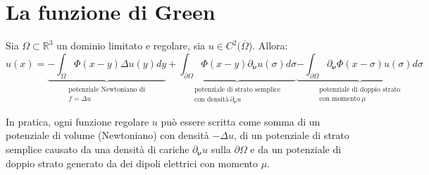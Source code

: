 \documentclass[10pt,a4paper,twoside,openright]{book}
\begin{document}
\section{La funzione di Green}
\begin{theorem}
	Sia $\displaystyle \Omega \subset \mathbb{R}^{3}$ un dominio limitato e regolare, sia $\displaystyle u\in C^{2}(\overline{\Omega }$). Allora:
	\begin{equation*}
		u(x) =\underbrace{-\int _{\Omega } \Phi (x-y) \Delta u(y) dy}_{ \begin{array}{l}
			\text{potenziale Newtoniano di}\\
			f=\Delta u
			\end{array}} +\underbrace{\int _{\partial \Omega } \Phi (x-y) \partial _{\bm{\nu}} u(\sigma) d\sigma }_{ \begin{array}{l}
			\text{potenziale di strato semplice}\\
			\text{con densità} \ \partial _{\bm{\nu}} u
			\end{array}}\underbrace{-\int _{\partial \Omega } \partial _{\bm{\nu}} \Phi (x-\sigma) u(\sigma) d\sigma }_{ \begin{array}{l}
			\text{potenziale di doppio strato}\\
			\text{con momento} \ \mu 
			\end{array}}
	\end{equation*}
\end{theorem}
In pratica, ogni funzione regolare $\displaystyle u$ può essere scritta come somma di un potenziale di volume (Newtoniano) con densità $\displaystyle -\Delta u$, di un potenziale di strato semplice causato da una densità di cariche $\displaystyle \partial _{\bm{\nu}} u$ sulla $\displaystyle \partial \Omega $ e da un potenziale di doppio strato generato da dei dipoli elettrici con momento $\displaystyle \mu $.
\end{document}
